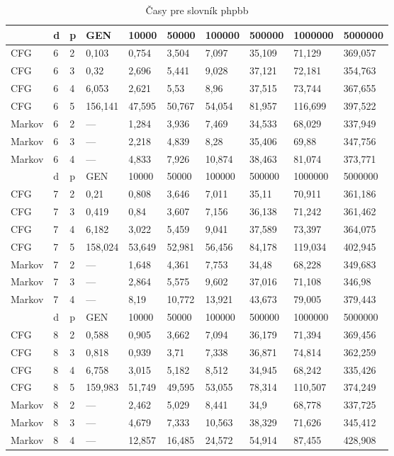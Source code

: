 \begin{table}[]
\centering
\caption{Časy pre slovník phpbb}
\label{tphpbb}
\begin{tabular}{lll|lllllll}
       & d & p & GEN     & 10000  & 50000  & 100000 & 500000 & 1000000 & 5000000 \\ \hline
CFG    & 6 & 2 & 0,103   & 0,754  & 3,504  & 7,097  & 35,109 & 71,129  & 369,057 \\
CFG    & 6 & 3 & 0,32    & 2,696  & 5,441  & 9,028  & 37,121 & 72,181  & 354,763 \\
CFG    & 6 & 4 & 6,053   & 2,621  & 5,53   & 8,96   & 37,515 & 73,744  & 367,655 \\
CFG    & 6 & 5 & 156,141 & 47,595 & 50,767 & 54,054 & 81,957 & 116,699 & 397,522 \\
Markov & 6 & 2 & ---     & 1,284  & 3,936  & 7,469  & 34,533 & 68,029  & 337,949 \\
Markov & 6 & 3 & ---     & 2,218  & 4,839  & 8,28   & 35,406 & 69,88   & 347,756 \\
Markov & 6 & 4 & ---     & 4,833  & 7,926  & 10,874 & 38,463 & 81,074  & 373,771 \\ \hline
       & d & p & GEN     & 10000  & 50000  & 100000 & 500000 & 1000000 & 5000000 \\ \hline
CFG    & 7 & 2 & 0,21    & 0,808  & 3,646  & 7,011  & 35,11  & 70,911  & 361,186 \\
CFG    & 7 & 3 & 0,419   & 0,84   & 3,607  & 7,156  & 36,138 & 71,242  & 361,462 \\
CFG    & 7 & 4 & 6,182   & 3,022  & 5,459  & 9,041  & 37,589 & 73,397  & 364,075 \\
CFG    & 7 & 5 & 158,024 & 53,649 & 52,981 & 56,456 & 84,178 & 119,034 & 402,945 \\
Markov & 7 & 2 & ---     & 1,648  & 4,361  & 7,753  & 34,48  & 68,228  & 349,683 \\
Markov & 7 & 3 & ---     & 2,864  & 5,575  & 9,602  & 37,016 & 71,108  & 346,98  \\
Markov & 7 & 4 & ---     & 8,19   & 10,772 & 13,921 & 43,673 & 79,005  & 379,443 \\ \hline
       & d & p & GEN     & 10000  & 50000  & 100000 & 500000 & 1000000 & 5000000 \\ \hline
CFG    & 8 & 2 & 0,588   & 0,905  & 3,662  & 7,094  & 36,179 & 71,394  & 369,456 \\
CFG    & 8 & 3 & 0,818   & 0,939  & 3,71   & 7,338  & 36,871 & 74,814  & 362,259 \\
CFG    & 8 & 4 & 6,758   & 3,015  & 5,182  & 8,512  & 34,945 & 68,242  & 335,426 \\
CFG    & 8 & 5 & 159,983 & 51,749 & 49,595 & 53,055 & 78,314 & 110,507 & 374,249 \\
Markov & 8 & 2 & ---     & 2,462  & 5,029  & 8,441  & 34,9   & 68,778  & 337,725 \\
Markov & 8 & 3 & ---     & 4,679  & 7,333  & 10,563 & 38,329 & 71,626  & 345,412 \\
Markov & 8 & 4 & ---     & 12,857 & 16,485 & 24,572 & 54,914 & 87,455  & 428,908
\end{tabular}
\end{table}

